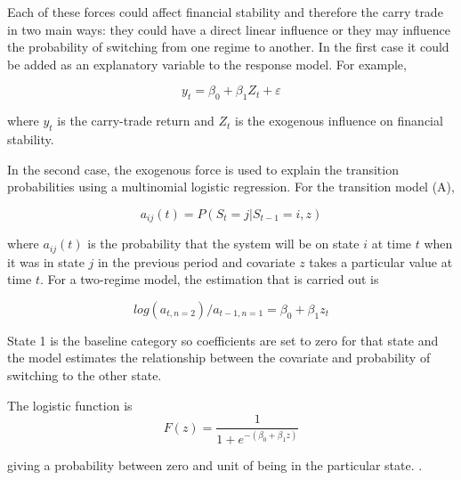 \documentclass[12pt, a4paper, oneside]{article} %
\begin{document}
Each of these forces could affect financial stability and therefore the carry trade in two main ways:  they could have a direct linear influence or they may influence the probability of switching from one regime to another.  In the first case it could be added as an explanatory variable to the response model. For example, 

\begin{equation}
\label{eqref:vix}
y_t = \beta_0 + \beta_1 Z_t + \varepsilon
\end{equation}

where $y_t$ is the carry-trade return and $Z_t$ is the exogenous influence on financial stability. 

In the second case, the exogenous force is used to explain the transition probabilities using a multinomial logistic regression. For the transition model (A), 

\begin{equation}
a_{ij}(t) = P(S_t = j|S_{t-1} = i, z)
\end{equation}

where $a_{ij}(t)$ is the probability that the system will be on state $i$ at time $t$ when it was in state $j$ in the previous period and covariate $z$ takes a particular value at time $t$.  For a two-regime model, the  estimation that is carried out is 

\begin{equation}
log(a_{t,n = 2})/ a_{t-1, n = 1} = \beta_{0} +\beta_1 z_t 
\end{equation}

State 1 is the baseline category so coefficients are set to zero for that state and the model estimates the relationship between the covariate and probability of switching to the other state. 

The logistic function is 
\begin{equation} 
F(z)  = \frac{1}{1 + e^{-(\beta_0 + \beta_1 z)}}
\label{eqref:zcov}
\end{equation}
 
giving a probability between zero and unit of being in the particular state. \citet[pp.174-75]{agresti2014categorical}. 
\end{document}
